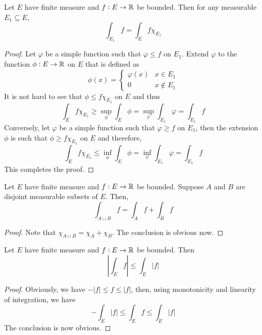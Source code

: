 \begin{proposition}
    Let $E$ have finite measure and $f: E\to\mathbb{R}$ be bounded. Then for any measurable $E_1\subseteq E$, 
    \begin{equation*}
        \int_{E_1} f = \int_E f\chi_{E_1}
    \end{equation*}
\end{proposition}
\begin{proof}
    Let $\varphi$ be a simple function such that $\varphi\le f$ on $E_1$. Extend $\varphi$ to the function $\phi: E\to\mathbb{R}$ on $E$ that is defined as 
    \begin{equation*}
        \phi(x) = 
        \begin{cases}
            \varphi(x) & x\in E_1\\
            0 & x\notin E_1
        \end{cases}
    \end{equation*}
    It is not hard to see that $\phi\le f\chi_{E_1}$ on $E$ and thus 
    \begin{equation*}
        \int_E f\chi_{E_1}\ge\sup_{\phi}\int_E\phi = \sup_{\varphi}\int_{E_1}\varphi = \int_{E_1} f
    \end{equation*}
    Conversely, let $\varphi$ be a simple function such that $\varphi\ge f$ on $E_1$, then the extension $\phi$ is such that $\phi\ge f\chi_{E_1}$ on $E$ and therefore, 
    \begin{equation*}
        \int_E f\chi_{E_1}\le\inf_\phi\int_E\phi = \inf_\varphi\int_{E_1}\varphi = \int_{E_1}f
    \end{equation*}
    This completes the proof.
\end{proof}

\begin{corollary}
    Let $E$ have finite measure and $f: E\to\mathbb{R}$ be bounded. Suppose $A$ and $B$ are disjoint measurable subsets of $E$. Then, 
    \begin{equation*}
        \int_{A\cup B}f = \int_Af + \int_Bf
    \end{equation*}
\end{corollary}
\begin{proof}
    Note that $\chi_{A\cup B} = \chi_A + \chi_B$. The conclusion is obvious now.
\end{proof}

\begin{lemma}
    Let $E$ have finite measure and $f:E\to\mathbb{R}$ be bounded. Then 
    \begin{equation*}
        \left|\int_E f\right|\le\int_E|f|
    \end{equation*}
\end{lemma}
\begin{proof}
    Obviously, we have $-|f|\le f\le|f|$, then, using monotonicity and linearity of integration, we have 
    \begin{equation*}
        -\int_E|f|\le\int_E f\le\int_E|f|
    \end{equation*}
    The conclusion is now obvious.
\end{proof}

